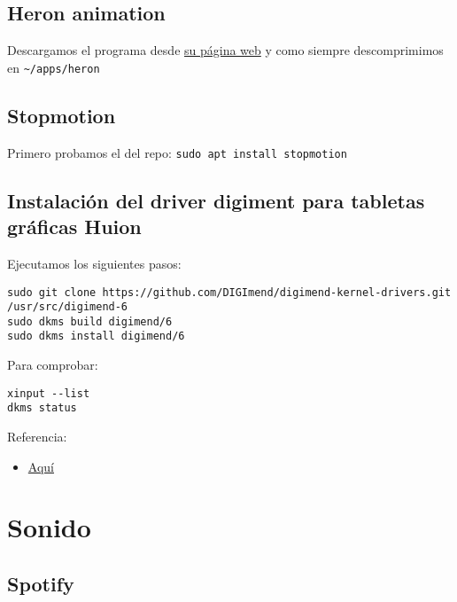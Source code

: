 \documentclass[
  12pt,
  spanish,
]{article}
\providecommand{\tightlist}{%
  \setlength{\itemsep}{0pt}\setlength{\parskip}{0pt}}
\begin{document}
\hypertarget{heron-animation}{%
\subsection{Heron animation}\label{heron-animation}}

Descargamos el programa desde
\href{https://heronanimation.brunolefevre.net/}{su página web} y como
siempre descomprimimos en \texttt{\textasciitilde{}/apps/heron}

\hypertarget{stopmotion}{%
\subsection{Stopmotion}\label{stopmotion}}

Primero probamos el del repo: \texttt{sudo\ apt\ install\ stopmotion}

\hypertarget{instalaciuxf3n-del-driver-digiment-para-tabletas-gruxe1ficas-huion}{%
\subsection{Instalación del driver digiment para tabletas gráficas
Huion}\label{instalaciuxf3n-del-driver-digiment-para-tabletas-gruxe1ficas-huion}}

Ejecutamos los siguientes pasos:

\begin{verbatim}
sudo git clone https://github.com/DIGImend/digimend-kernel-drivers.git /usr/src/digimend-6
sudo dkms build digimend/6
sudo dkms install digimend/6
\end{verbatim}

Para comprobar:

\begin{verbatim}
xinput --list
dkms status
\end{verbatim}

Referencia:

\begin{itemize}
\tightlist
\item
  \href{https://davidrevoy.com/article331/setup-huion-giano-wh1409-tablet-on-linux-mint-18-1-ubuntu-16-04}{Aquí}
\end{itemize}

\hypertarget{sonido}{%
\section{Sonido}\label{sonido}}

\hypertarget{spotify}{%
\subsection{Spotify}\label{spotify}}
\end{document}
